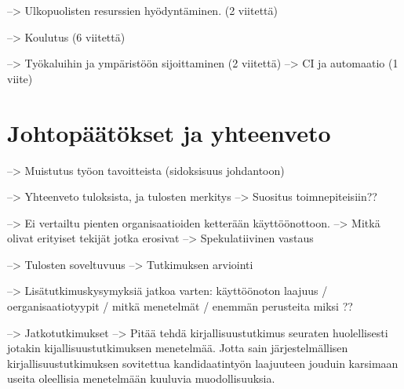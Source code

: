 --> Ulkopuolisten resurssien hyödyntäminen. (2 viitettä)

--> Koulutus (6 viitettä)

--> Työkaluihin ja ympäristöön sijoittaminen (2 viitettä)
--> CI ja automaatio (1 viite)

\clearpage
\section{Johtopäätökset ja yhteenveto}
\label{sec:johtopaatokset}

--> Muistutus työon tavoitteista (sidoksisuus johdantoon)

--> Yhteenveto tuloksista, ja tulosten merkitys
--> Suositus toimnepiteisiin??

--> Ei vertailtu pienten organisaatioiden ketterään käyttöönottoon.
--> Mitkä olivat erityiset tekijät jotka erosivat
--> Spekulatiivinen vastaus

--> Tulosten soveltuvuus
--> Tutkimuksen arviointi

--> Lisätutkimuskysymyksiä jatkoa varten: käyttöönoton laajuus /
oerganisaatiotyypit / mitkä menetelmät / enemmän perusteita miksi ?? 

--> Jatkotutkimukset
--> Pitää tehdä kirjallisuustutkimus seuraten huolellisesti jotakin
kijallisuustutkimuksen menetelmää. Jotta sain järjestelmällisen
kirjallisuustutkimuksen sovitettua kandidaatintyön laajuuteen jouduin
karsimaan useita oleellisia menetelmään kuuluvia muodollisuuksia.


